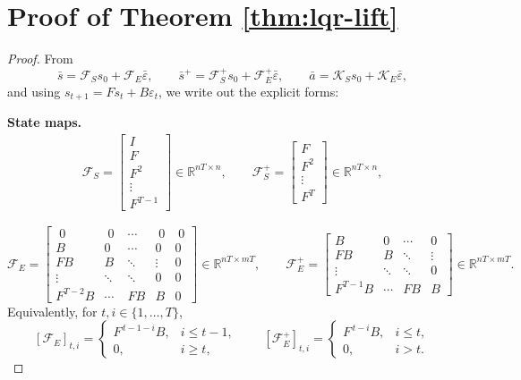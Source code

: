 \section{Proof of Theorem \ref{thm:lqr-lift} }
\label{sec:app-proof-lqg-lift}

\begin{proof}
    From
      \[
      \bar s=\mathcal F_S s_0+\mathcal F_E \bar\varepsilon,\qquad
      \bar s^+=\mathcal F_S^+ s_0+\mathcal F_E^+ \bar\varepsilon,\qquad
      \bar a=\mathcal K_S s_0+\mathcal K_E \bar\varepsilon,
      \]
    and using $s_{t+1} = F s_t + B \varepsilon_t$, we write out the explicit forms:
      
    \medskip
    \noindent\textbf{State maps.}
    \begin{align}\label{eq:lqr-lift-state-maps}
      \mathcal F_S=\begin{bmatrix}
      I\\[2pt] F\\[2pt] F^2\\[-2pt]\vdots\\[2pt] F^{T-1}
      \end{bmatrix}\!\in\mathbb R^{nT\times n},
      \qquad
      \mathcal F_S^+=\begin{bmatrix}
      F\\[2pt] F^2\\[-2pt]\vdots\\[2pt] F^{T}
      \end{bmatrix}\!\in\mathbb R^{nT\times n},
    \end{align}
  
    \[
    \mathcal F_E=
    \begin{bmatrix}
    \;0\;&\;0\;&\cdots&\;0&\;0\\
    B&0&\cdots&0&0\\
    FB&B&\ddots&\vdots&0\\
    \vdots&\ddots&\ddots&0&0\\
    F^{T-2}B&\cdots&FB&B&0 
    \end{bmatrix}\!\in\mathbb R^{nT\times mT},
    \qquad
    \mathcal F_E^+=
    \begin{bmatrix}
    B&0&\cdots&0\\
    FB&B&\ddots&\vdots\\
    \vdots&\ddots&\ddots&0\\
    F^{T-1}B&\cdots&FB&B
    \end{bmatrix}\!\in\mathbb R^{nT\times mT}.
    \]
    Equivalently, for \(t,i\in\{1,\ldots,T\}\),
    \[
    [\mathcal F_E]_{t,i}=
    \begin{cases}
    F^{\,t-1-i}B,& i\le t-1,\\[2pt]
    0,& i\ge t,
    \end{cases}
    \qquad
    [\mathcal F_E^+]_{t,i}=
    \begin{cases}
    F^{\,t-i}B,& i\le t,\\[2pt]
    0,& i>t.
    \end{cases}
    \]
    

\end{proof}
